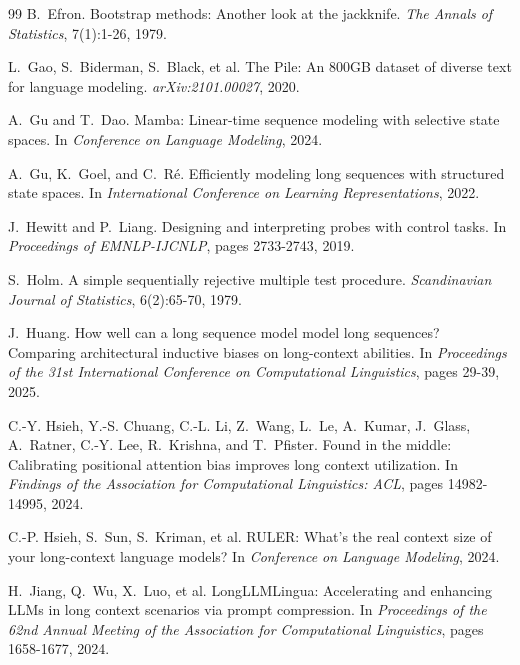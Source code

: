 \documentclass{article}
\begin{document}
{\begin{thebibliography}{99}
B.~Efron.
\newblock Bootstrap methods: Another look at the jackknife.
\newblock \emph{The Annals of Statistics}, 7(1):1-26, 1979.

L.~Gao, S.~Biderman, S.~Black, et al.
\newblock The Pile: An 800GB dataset of diverse text for language modeling.
\newblock \emph{arXiv:2101.00027}, 2020.

A.~Gu and T.~Dao.
\newblock Mamba: Linear-time sequence modeling with selective state spaces.
\newblock In \emph{Conference on Language Modeling}, 2024.

A.~Gu, K.~Goel, and C.~R\'e.
\newblock Efficiently modeling long sequences with structured state spaces.
\newblock In \emph{International Conference on Learning Representations}, 2022.

J.~Hewitt and P.~Liang.
\newblock Designing and interpreting probes with control tasks.
\newblock In \emph{Proceedings of EMNLP-IJCNLP}, pages 2733-2743, 2019.

S.~Holm.
\newblock A simple sequentially rejective multiple test procedure.
\newblock \emph{Scandinavian Journal of Statistics}, 6(2):65-70, 1979.

J.~Huang.
\newblock How well can a long sequence model model long sequences? Comparing architectural inductive biases on long-context abilities.
\newblock In \emph{Proceedings of the 31st International Conference on Computational Linguistics}, pages 29-39, 2025.

C.-Y. Hsieh, Y.-S. Chuang, C.-L. Li, Z.~Wang, L.~Le, A.~Kumar, J.~Glass, A.~Ratner, C.-Y. Lee, R.~Krishna, and T.~Pfister.
\newblock Found in the middle: Calibrating positional attention bias improves long context utilization.
\newblock In \emph{Findings of the Association for Computational Linguistics: ACL}, pages 14982-14995, 2024.

C.-P. Hsieh, S.~Sun, S.~Kriman, et al.
\newblock RULER: What's the real context size of your long-context language models?
\newblock In \emph{Conference on Language Modeling}, 2024.

H.~Jiang, Q.~Wu, X.~Luo, et al.
\newblock LongLLMLingua: Accelerating and enhancing LLMs in long context scenarios via prompt compression.
\newblock In \emph{Proceedings of the 62nd Annual Meeting of the Association for Computational Linguistics}, pages 1658-1677, 2024.


\end{thebibliography}}
\end{document}
